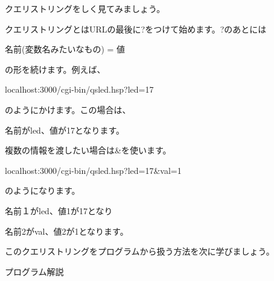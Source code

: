\documentclass[a4paper,12pt,dvipdfmx]{jarticle}
\begin{document}
\bigskip

クエリストリングをしく見てみましょう。

クエリストリングとはURLの最後に?をつけて始めます。?のあとには

名前(変数名みたいなもの) = 値

の形を続けます。例えば、

localhost:3000/cgi-bin/qsled.hsp?led=17

のようにかけます。この場合は、

名前がled、値が17となります。

複数の情報を渡したい場合は\&を使います。

localhost:3000/cgi-bin/qsled.hsp?led=17\&val=1

のようになります。

名前１がled、値1が17となり

名前2がval、値2が1となります。

このクエリストリングをプログラムから扱う方法を次に学びましょう。

\clearpage
プログラム解説
\end{document}

